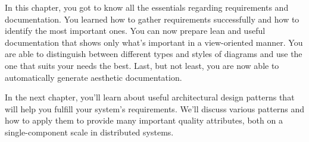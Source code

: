 In this chapter, you got to know all the essentials regarding requirements and documentation. You learned how to gather requirements successfully and how to identify the most important ones. You can now prepare lean and useful documentation that shows only what's important in a view-oriented manner. You are able to distinguish between different types and styles of diagrams and use the one that suits your needs the best. Last, but not least, you are now able to automatically generate aesthetic documentation.

In the next chapter, you'll learn about useful architectural design patterns that will help you fulfill your system's requirements. We'll discuss various patterns and how to apply them to provide many important quality attributes, both on a single-component scale in distributed systems.
